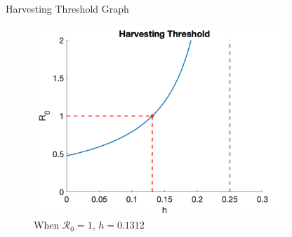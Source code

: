 \documentclass{beamer}
\begin{document}
\begin{frame}{Harvesting Threshold Graph}
    \begin{figure}
        \centering
        \includegraphics[width = 0.85\textwidth]{Latex/Figures/Graphs/threshold_graph.png}
        \caption{When $\mathscr{R}_0 = 1$, $h = 0.1312$}
        \label{fig:threshold}
    \end{figure}
\end{frame}
\end{document}

